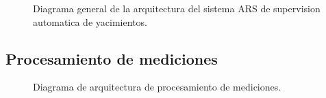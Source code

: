 \documentclass{article}
\theoremstyle{definition}
\theoremstyle{remark}
\begin{document}
\begin{figure}[H]
	\caption{Diagrama general de la arquitectura del sistema ARS de supervision automatica de yacimientos.}
\end{figure}

\subsection{Procesamiento de mediciones}

\begin{figure}[H]
	\caption{Diagrama de arquitectura de procesamiento de mediciones.}
\end{figure}
\end{document}
